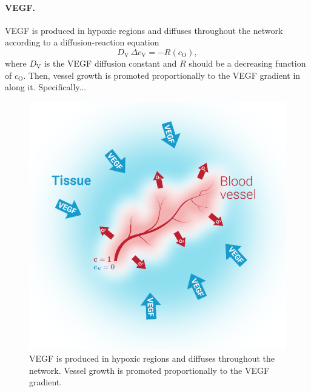 \documentclass[aps,pra,a4paper,twocolumn,10pt,superscriptaddress,longbibliography]{revtex4-1}
\newcommand{\ox}{\textrm{O}}
\newcommand{\vegf}{\textrm{V}}
\begin{document}
\paragraph{VEGF.}
VEGF is produced in hypoxic regions and diffuses throughout the network according to a diffusion-reaction equation
\begin{equation}
D_{\vegf} \, \Delta c_{\vegf} = -R(c_\ox),
\end{equation}
where $D_\vegf$ is the VEGF diffusion constant and $R$ should be a decreasing function of $c_\ox$. Then, vessel growth is promoted proportionally to the VEGF gradient in along it. Specifically...
\begin{figure}[h!]
\centering
\includegraphics[width=\columnwidth]{schematic-vegf.png}
\caption{VEGF is produced in hypoxic regions and diffuses throughout the network. Vessel growth is promoted proportionally to the VEGF gradient.}
\label{fig:vegf-schematic}
\end{figure}

%
\end{document}

